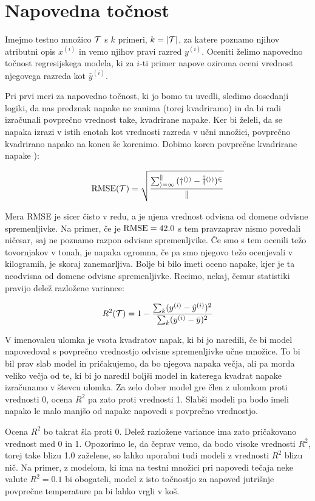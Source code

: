 \section{Napovedna točnost}

Imejmo testno množico $\cal{T}$ s $k$ primeri, $k=|\cal{T}|$, za katere poznamo njihov atributni opis $x^{(i)}$ in vemo njihov pravi razred $y^{(i)}$. Oceniti želimo napovedno točnost regresijskega modela, ki za $i$-ti primer napove oziroma oceni vrednost njegovega razreda kot $\hat{y}^{(i)}$.

Pri prvi meri za napovedno točnost, ki jo bomo tu uvedli, sledimo dosedanji logiki, da nas predznak napake ne zanima (torej kvadriramo) in da bi radi izračunali povprečno vrednost take, kvadrirane napake. Ker bi želeli, da se napaka izrazi v istih enotah kot vrednosti razreda v učni množici, povprečno kvadrirano napako na koncu še korenimo. Dobimo koren povprečne kvadrirane napake ):

$$ {\rm RMSE}(\cal{T})=\sqrt{\sum_{i=1}^k{(y^{(i)}-\hat{y}^{(i)})^2}\over k} $$

Mera RMSE je sicer čisto v redu, a je njena vrednost odvisna od domene odvisne spremenljivke. Na primer, če je ${\rm RMSE}=42.0$ s tem pravzaprav nismo povedali ničesar, saj ne poznamo razpon odvisne spremenljvike. Če smo s tem ocenili težo tovornjakov v tonah, je napaka ogromna, če pa smo njegovo težo ocenjevali v kilogramih, je skoraj zanemarljiva. Bolje bi bilo imeti oceno napake, kjer je ta neodvisna od domene odvisne spremenljivke. Recimo, nekaj, čemur statistiki pravijo delež razložene variance:

$$ R^2({\cal T})=1-{\sum_k (y^{(i)}-\hat{y}^{(i)})^2
  \over \sum_k(y^{(i)}-\bar{y})^2} $$

V imenovalcu ulomka je vsota kvadratov napak, ki bi jo naredili, če bi model napovedoval s povprečno vrednostjo odvisne spremenljivke učne množice. To bi bil prav slab model in pričakujemo, da bo njegova napaka večja, ali pa morda veliko večja od te, ki bi jo naredil boljši model in katerega kvadrat napake izračunamo v števcu ulomka. Za zelo dober model gre člen z ulomkom proti vrednosti 0, ocena $R^2$ pa zato proti vrednosti 1. Slabši modeli pa bodo imeli napako le malo manjšo od napake napovedi s povprečno vrednostjo.

Ocena $R^2$ bo takrat šla proti 0. Delež razložene variance ima zato pričakovano vrednost med 0 in 1. Opozorimo le, da čeprav vemo, da bodo visoke vrednosti $R^2$, torej take blizu 1.0 zaželene, so lahko uporabni tudi modeli z vrednosti $R^2$ blizu nič. Na primer, z modelom, ki ima na testni množici pri napovedi tečaja neke valute $R^2=0.1$ bi obogateli, model z isto točnostjo za napoved jutrišnje povprečne temperature pa bi lahko vrgli v koš.

